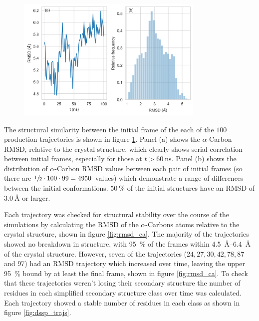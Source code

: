 \begin{figure}
    \centering
    \includegraphics[width=0.8\textwidth]{chapters/aadh/figures/rmsd_seed_trajectory.png}
    \label{fig:rmsd_seed_traj}
\end{figure}

 The structural similarity between the initial frame of the each of the $100$ production trajectories is shown in figure \ref{fig:rmsd_seed_traj}. Panel (a) shows the $\alpha$-Carbon RMSD, relative to the crystal structure, which clearly shows serial correlation between initial frames, especially for those at $t>\SI{60}{\nano\second}$. Panel (b) shows the distribution of $\alpha$-Carbon RMSD values between each pair of initial frames (so there are $\sfrac{1}{2}\cdot 100\cdot 99 = 4950$ values) which demonstrate a range of differences between the initial conformations. $\SI{50}{\percent}$ of the initial structures have an RMSD of $\SI{3.0}{\angstrom}$ or larger.  

Each trajectory was checked for structural stability over the course of the simulations by calculating the RMSD of the $\alpha$-Carbons atoms relative to the crystal structure, shown in figure \ref{fig:rmsd_ca}. The majority of the trajectories showed no breakdown in structure, with  \SI{95}{\percent} of the frames within \SIrange{4.5}{6.4}{\angstrom} of the crystal structure. However, seven of the trajectories ($24, 27, 30, 42, 78, 87$ and $97$) had an RMSD trajectory which increased over time, leaving the upper \SI{95}{\percent} bound by at least the final frame, shown in figure \ref{fig:rmsd_ca}. To check that these trajectories weren't losing their secondary structure the number of residues in each simplified secondary structure class \cite{kabschDictionaryProteinSecondary1983} over time was calculated. Each trajectory showed a stable number of residues in each class as shown in figure \ref{fig:dssp_trajs}.

